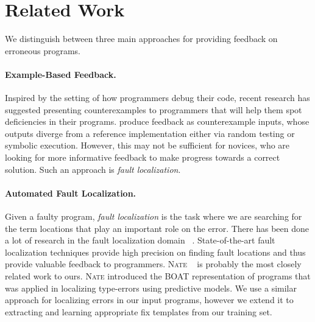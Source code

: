 \section{Related Work}
\label{sec:related-work}
We distinguish between three main approaches for providing feedback on erroneous
programs.

\paragraph{Example-Based Feedback.} Inspired by the setting of how programmers
debug their code, recent research has suggested presenting counterexamples to
programmers that will help them spot deficiencies in their programs.
\citep{Cadar_2006, Song_2019, Tillmann_2013} produce feedback as counterexample
inputs, whose outputs diverge from a reference implementation either via random
testing or symbolic execution. However, this may not be sufficient for novices,
who are looking for more informative feedback to make progress towards a correct
solution. Such an approach is \emph{fault localization}.

\paragraph{Automated Fault Localization.} Given a faulty program,
\emph{fault localization} is the task where we are searching for
the term locations that play an important role on the error.
%
There has been done a lot of research in the fault localization domain
~\citep{Seidel:2017,Wand1986-nw,Haack2003-vc,Tip2001-qp}. State-of-the-art fault
localization techniques provide high precision on finding fault locations and
thus provide valuable feedback to programmers. \textsc{Nate}
~\citep{Seidel:2017} is probably the most closely related work to ours.
\textsc{Nate} introduced the BOAT representation of programs that was applied in
localizing type-errors using predictive models. We use a similar approach for
localizing errors in our input programs, however we extend it to extracting and
learning appropriate fix templates from our training set.

